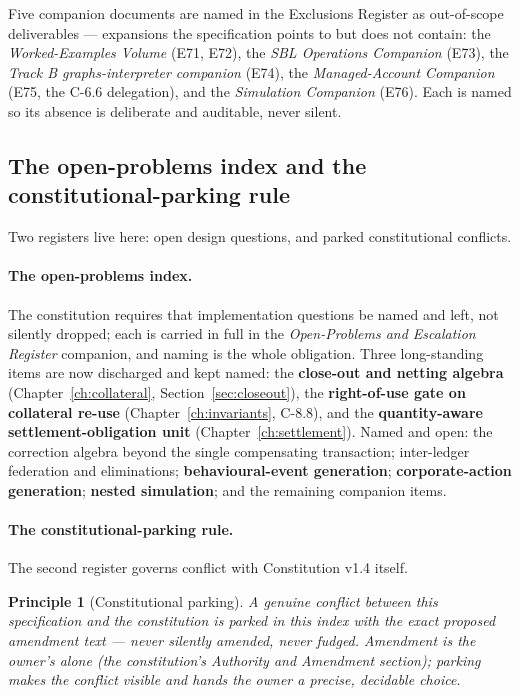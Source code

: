 \documentclass[11pt,a4paper]{article}
\newtheorem{principle}[definition]{Principle}
\begin{document}
Five companion documents are named in the Exclusions Register as out-of-scope deliverables ---
expansions the specification points to but does not contain: the \emph{Worked-Examples Volume}
(E71, E72), the \emph{SBL Operations Companion} (E73), the \emph{Track B graphs-interpreter
companion} (E74), the \emph{Managed-Account Companion} (E75, the C-6.6 delegation), and the
\emph{Simulation Companion} (E76). Each is named so its absence is deliberate and auditable,
never silent.

\subsection{The open-problems index and the constitutional-parking rule}

Two registers live here: open design questions, and parked constitutional conflicts.

\paragraph{The open-problems index.} The constitution requires that implementation questions be
named and left, not silently dropped; each is carried in full in the \emph{Open-Problems and
Escalation Register} companion, and naming is the whole obligation. Three long-standing items are
now discharged and kept named: the \textbf{close-out and netting algebra}
(Chapter~\ref{ch:collateral}, Section~\ref{sec:closeout}), the \textbf{right-of-use gate on
collateral re-use} (Chapter~\ref{ch:invariants}, C-8.8), and the \textbf{quantity-aware
settlement-obligation unit} (Chapter~\ref{ch:settlement}). Named and open: the correction algebra beyond the single
compensating transaction; inter-ledger federation and eliminations; \textbf{behavioural-event
generation}; \textbf{corporate-action generation}; \textbf{nested simulation}; and the remaining
companion items.

\paragraph{The constitutional-parking rule.} The second register governs conflict with
Constitution v1.4 itself.

\begin{principle}[Constitutional parking]
A genuine conflict between this specification and the constitution is parked in this index
with the exact proposed amendment text --- never silently amended, never fudged. Amendment
is the owner's alone (the constitution's \emph{Authority and Amendment} section); parking
makes the conflict visible and hands the owner a precise, decidable choice.
\end{principle}
\end{document}
